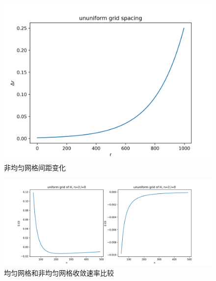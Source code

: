 \documentclass[11pt]{article}
\begin{document}
\begin{figure}
  \centering
  \includegraphics[width=0.8\linewidth]{photo/ununiformgrid.png}
  \caption{非均匀网格间距变化}
  \label{fig:ununiformgrid}
\end{figure}

\begin{figure}
  \centering
  \includegraphics[width=0.8\linewidth]{photo/compare.png}
  \caption{均匀网格和非均匀网格收敛速率比较}
  \label{fig:compare}
\end{figure}
\end{document}
